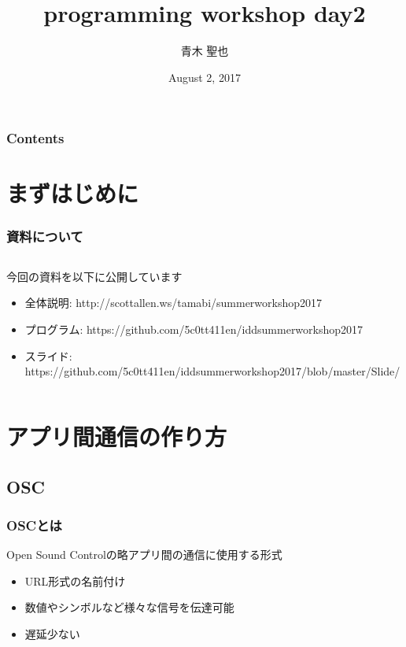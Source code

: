 \documentclass[10pt, dvipdfmx]{beamer}
\title{programming workshop day2}
\author{青木 聖也}
\institute[所属]{多摩美術大学情報デザイン研究室}
\date{August 2, 2017}
\begin{document}
    \begin{frame}[plain]
        \frametitle{}
	    \titlepage
    \end{frame}

    \begin{frame}
        \frametitle{Contents}
        \tableofcontents
    \end{frame}

    \section{まずはじめに}
        \begin{frame}
            \frametitle{資料について}
            \begin{columns}[c]
                \begin{column}{0.80\textwidth}
                    \begin{block}{今回の資料を以下に公開しています}
                        \begin{itemize}
                            \scriptsize
                            \item 全体説明: http://scottallen.ws/tamabi/summerworkshop2017
                            \item プログラム: https://github.com/5c0tt411en/iddsummerworkshop2017
                            \item スライド: https://github.com/5c0tt411en/iddsummerworkshop2017/blob/master/Slide/
                        \end{itemize}
                    \end{block}
                \end{column}
            \end{columns}
        \end{frame}

    \section{アプリ間通信の作り方}
    \subsection{OSC}
        \begin{frame}
            \frametitle{OSCとは}
            \begin{block}{Open Sound Controlの略アプリ間の通信に使用する形式}
                \begin{itemize}
                    \item URL形式の名前付け
                    \item 数値やシンボルなど様々な信号を伝達可能
                    \item 遅延少ない
                \end{itemize}
            \end{block}
        \end{frame}
\end{document}
